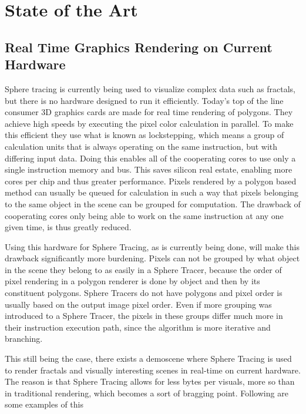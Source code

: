 \chapter{State of the Art}

\section{ Real Time Graphics Rendering on Current Hardware } 

Sphere tracing is currently being used to visualize complex data such as 
fractals, but there is no hardware designed to run it efficiently. Today's top 
of the line consumer 3D graphics cards are made for real time rendering of 
polygons. They achieve high speeds by executing the pixel color calculation in 
parallel. To make this efficient they use what is known as lockstepping, which 
means a group of calculation units that is always operating on the same 
instruction, but with differing input data. Doing this enables all of the 
cooperating cores to use only a single instruction memory and bus. This saves 
silicon real estate, enabling more cores per chip and thus greater performance. 
Pixels rendered by a polygon based method can usually be queued for calculation 
in such a way that pixels belonging to the same object in the scene can be 
grouped for computation. The drawback of cooperating cores only being able 
to work on the same instruction at any one given time, is thus greatly reduced.

Using this hardware for Sphere Tracing, as is currently being done, will make 
this drawback significantly more burdening. Pixels can not be grouped by
what object in the scene they belong to as easily in a Sphere Tracer, because
the order of pixel rendering in a polygon renderer is done by object and then
by its constituent polygons. Sphere Tracers do not have polygons and pixel 
order is usually based on the output image pixel order. Even if more grouping 
was introduced to a Sphere Tracer, the pixels in these groups differ much more 
in their instruction execution path, since the algorithm is more iterative and 
branching.

This still being the case, there exists a demoscene where Sphere Tracing is used
to render fractals and visually interesting scenes in real-time on current
hardware. The reason is that Sphere Tracing allows for less bytes per visuals,
	more so than in traditional rendering, which becomes a sort of bragging
	point. Following are some examples of this\cite{InigoQuilez}

